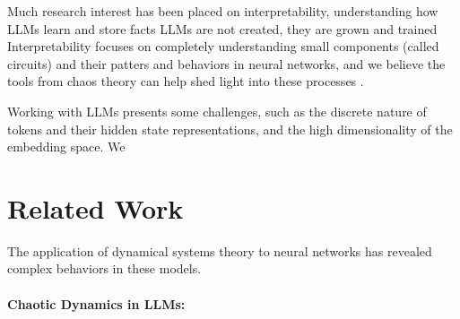 \documentclass[a4paper,12pt]{article}
\begin{document}
Much research interest has been placed on interpretability, understanding how LLMs learn and store facts
LLMs are not created, they are grown and trained
Interpretability focuses on completely understanding small components (called circuits) and their patters and behaviors in neural networks, and we believe the tools from chaos theory can help shed light into these processes \cite{olah2020zoom} \cite{ameisen2025circuit} \cite{lindsey2025biology}.

Working with LLMs presents some challenges, such as the discrete nature of tokens and their hidden state representations, and the high dimensionality of the embedding space. We 

\section{Related Work} 
\label{sec:related_work}

The application of dynamical systems theory to neural networks has revealed complex behaviors in these models. 

\paragraph{Chaotic Dynamics in LLMs:}
\end{document}

